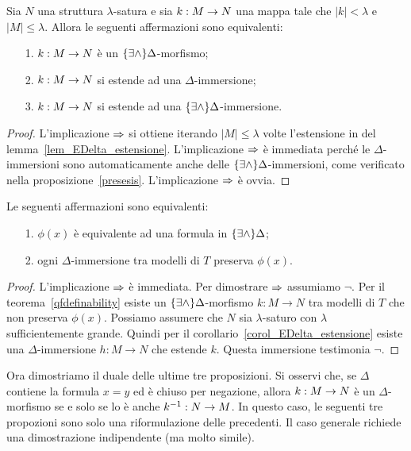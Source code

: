 \begin{corollary}\label{corol_EDelta_estensione}
Sia $N$ una struttura $\lambda$-satura e sia $k:M\rightarrow N$ una mappa tale che $|k|<\lambda$ e $|M|\le\lambda$. Allora le seguenti affermazioni sono equivalenti:
\begin{itemize}
\item[1.] $k:M\rightarrow N$ \`e un $\{\exists\wedge\}\Delta$-morfismo;
\item[2.] $k:M\rightarrow N$ si estende ad una $\Delta$-immersione;
\item[3.] $k:M\rightarrow N$ si estende ad una $\{\exists\wedge\}\Delta$-immersione.
\end{itemize}
\end{corollary}
\begin{proof}
L'implicazione $\Rightarrow$ si ottiene iterando $|M|\le\lambda$ volte l'estensione in  del lemma~\ref{lem_EDelta_estensione}. L'implicazione $\Rightarrow$ \`e immediata perch\'e le $\Delta$-immersioni sono automaticamente anche delle $\{\exists\wedge\}\Delta$-immersioni, come verificato nella proposizione~\ref{presesis}. L'implicazione $\Rightarrow$ \`e ovvia.
\end{proof}


\begin{theorem}
Le seguenti affermazioni sono equivalenti:
\begin{itemize}
\item[1.] $\phi(x)$ \`e equivalente ad una formula in $\{\exists\wedge\}\Delta$;
\item[2.] ogni $\Delta$-immersione tra modelli di $T$ preserva $\phi(x)$.
\end{itemize}
\end{theorem}
\begin{proof}
L'implicazione $\Rightarrow$ \`e immediata. Per dimostrare  $\Rightarrow$ assumiamo $\neg$. Per il teorema~\ref{qfdefinability} esiste un $\{\exists\wedge\}\Delta$-morfismo $k:M\to N$ tra modelli di $T$ che non preserva $\phi(x)$. Possiamo assumere che $N$ sia $\lambda$-saturo con $\lambda$ sufficientemente grande. Quindi per il corollario~\ref{corol_EDelta_estensione} esiste una $\Delta$-immersione $h:M\to N$ che estende $k$. Questa immersione testimonia $\neg$.
\end{proof}

Ora dimostriamo il duale delle ultime tre proposizioni. Si osservi che, se $\Delta$ contiene la formula $x=y$ ed \`e chiuso per negazione, allora  $k:M\rightarrow N$ \`e un $\Delta$-morfismo se e solo se lo \`e anche $k^{-1}:N\rightarrow M$. In questo caso, le seguenti tre propozioni sono solo una riformulazione delle precedenti.  Il caso generale richiede una dimostrazione indipendente (ma molto simile).

